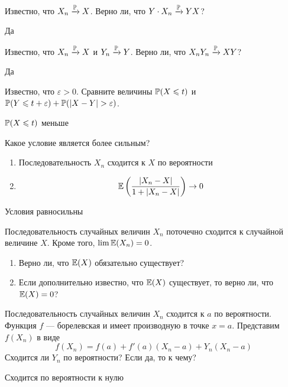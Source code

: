\begin{solution}
\begin{solution}
\begin{solution}
\begin{solution}
\begin{problem}
Известно, что $X_n \xrightarrow{\P} X$. Верно ли, что $Y\cdot X_n \xrightarrow{\P} YX$? 
\end{problem} 
\begin{solution} 
Да
\end{solution}

\begin{problem}
Известно, что $X_n \xrightarrow{\P} X$ и $Y_n \xrightarrow{\P} Y$. Верно ли, что $X_nY_n \xrightarrow{\P} XY$? 
\end{problem} 
\begin{solution} 
Да
\end{solution}

\begin{problem}
Известно, что $\varepsilon>0$. Сравните величины $\P(X\leq t)$ и $\P(Y\leq t+\varepsilon)+\P(|X-Y|>\varepsilon)$.
\end{problem} 
\begin{solution} 
$\P(X\leq t)$ меньше
\end{solution}

\begin{problem}
Какое условие является более сильным?
\begin{enumerate}
\item Последовательность $X_n$ сходится к $X$ по вероятности
\item \[ 
\E\left(\frac{|X_n-X|}{1+|X_n-X|}\right)\to 0
\]
\end{enumerate}
\end{problem} 
\begin{solution} 
Условия равносильны
\end{solution}

\begin{problem}
Последовательность случайных величин $X_n$ поточечно сходится к случайной величине $X$. Кроме того, $\lim \E(X_n)=0$. 
\begin{enumerate}
\item Верно ли, что $\E(X)$ обязательно существует? 
\item Если дополнительно известно, что $\E(X)$ существует, то верно ли, что $\E(X)=0$?
\end{enumerate}
\end{problem} 
\begin{solution} 

\end{solution}

\begin{problem}
Последовательность случайных величин $X_n$ сходится к $a$ по вероятности. Функция $f$ --- борелевская и имеет производную в точке $x=a$. Представим $f(X_n)$ в виде
\begin{equation}
f(X_n)=f(a)+f'(a)(X_n-a)+Y_n(X_n-a)
\end{equation}
Сходится ли $Y_n$ по вероятности? Если да, то к чему?
\end{problem} 
\begin{solution} 
Сходится по вероятности к нулю
\end{solution}


\end{solution}
\end{solution}
\end{solution}
\end{solution}
